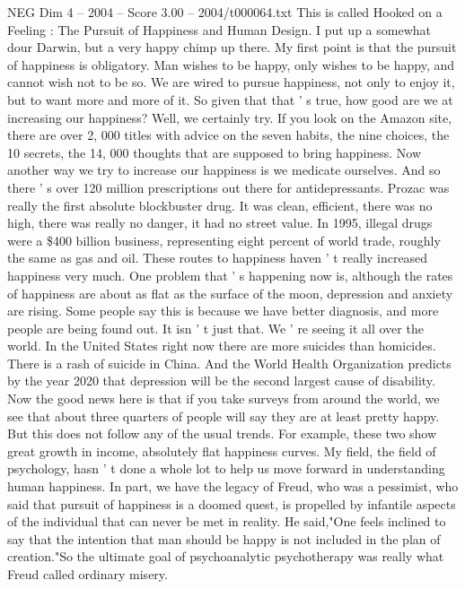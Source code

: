 \begin{textsample}{NEG Dim 4 – 2004 – Score 3.00 – 2004/t000064.txt}  \label{ex:f4_neg_026}
This is called Hooked on a Feeling : The Pursuit of Happiness and Human Design.
I put up a somewhat dour Darwin, but a very happy chimp up there.
My first point is that the pursuit of happiness is obligatory.
Man wishes to be happy, only wishes to be happy, and cannot wish not to be so.
We are wired to pursue happiness, not only to enjoy it, but to want more and more of it.
So given that that ' s true, how good are we at increasing our happiness?
Well, we certainly try.
If you look on the Amazon site, there are over 2, 000 titles with advice on the seven habits, the nine choices, the 10 secrets, the 14, 000 thoughts that are supposed to bring happiness.
Now another way we try to increase our happiness is we medicate ourselves.
And so there ' s over 120 million prescriptions out there for antidepressants.
Prozac was really the first absolute blockbuster drug.
It was clean, efficient, there was no high, there was really no danger, it had no street value.
In 1995, illegal drugs were a \$400 billion business, representing eight percent of world trade, roughly the same as gas and oil.
These routes to happiness haven ' t really increased happiness very much.
One problem that ' s happening now is, although the rates of happiness are about as flat as the surface of the moon, depression and anxiety are rising.
Some people say this is because we have better diagnosis, and more people are being found out.
It isn ' t just that.
We ' re seeing it all over the world.
In the United States right now there are more suicides than homicides.
There is a rash of suicide in China.
And the World Health Organization predicts by the year 2020 that depression will be the second largest cause of disability.
Now the good news here is that if you take surveys from around the world, we see that about three quarters of people will say they are at least pretty happy.
But this does not follow any of the usual trends.
For example, these two show great growth in income, absolutely flat happiness curves.
My field, the field of psychology, hasn ' t done a whole lot to help us move forward in understanding human happiness.
In part, we have the legacy of Freud, who was a pessimist, who said that pursuit of happiness is a doomed quest, is propelled by infantile aspects of the individual that can never be met in reality.
He said,"One feels inclined to say that the intention that man should be happy is not included in the plan of creation."So the ultimate goal of psychoanalytic psychotherapy was really what Freud called ordinary misery.

\end{textsample}
